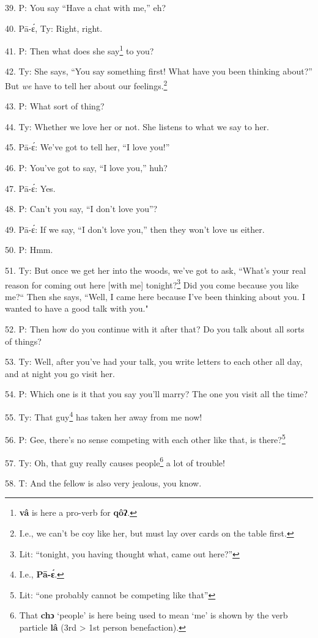 39. P: You say ``Have a chat with me,'' eh?

40. Pā-ɛ́, Ty: Right, right.

41. P: Then what does she say\footnote{\textbf{vâ} is here a pro-verb for \textbf{qôʔ}.} to you?

42. Ty: She says, ``You say something first! What have you been thinking
about?'' But \textit{we} have to tell her about our feelings.\footnote{I.e., we can't be coy like her, but must lay over cards on the table first.}

43. P: What sort of thing?

44. Ty: Whether we love her or not. She listens to what we say to her.

45. Pā-ɛ́: We've got to tell her, ``I love you!''

46. P: You've got to say, ``I love you,'' huh?

47. Pā-ɛ́: Yes.

48. P: Can't you say, ``I don't love you''?

49. Pā-ɛ́: If we say, ``I don't love you,'' then they won't
love us either.

50. P: Hmm.

51. Ty: But once we get her into the woods, we've got to ask, ``What's
your real reason for coming out here [with me] tonight?\footnote{Lit: ``tonight, you having thought what, came out here?''} Did you come because
you like me?`` Then she says, ``Well, I came here because I've
been thinking about you. I wanted to have a good talk with you."

52. P: Then how do you continue with it after that? Do you talk about all
sorts of things?

53. Ty: Well, after you've had your talk, you write letters to each other
all day, and at night you go visit her.

54. P: Which one is it that you say you'll marry? The one you visit all
the time?

55. Ty: That guy\footnote{I.e., \textbf{Pā-ɛ́}.} has taken her away from me now!

56. P: Gee, there's no sense competing with each other like that, is there?\footnote{Lit: ``one probably cannot be competing like that''}

57. Ty: Oh, that guy really causes people\footnote{That \textbf{chɔ} `people' is here being used to mean `me' is shown by the verb particle \textbf{lâ} (3rd > 1st person benefaction).} a lot of trouble!

58. T: And the fellow is also very jealous, you know.

